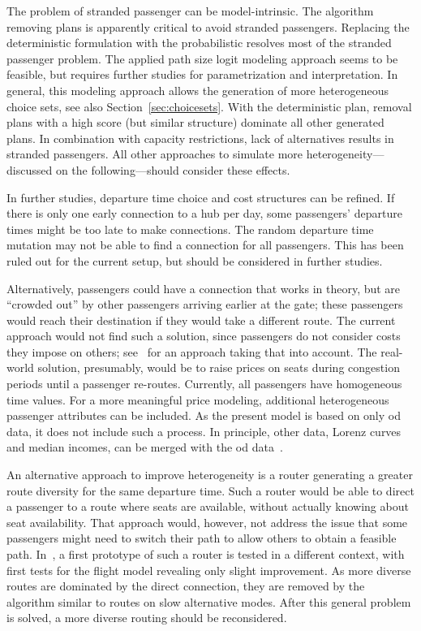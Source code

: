 The problem of stranded passenger can be model-intrinsic. 
The algorithm removing plans is apparently critical to avoid stranded passengers. 
Replacing the deterministic formulation with the probabilistic resolves most of the stranded passenger problem. 
The applied path size logit modeling approach seems to be feasible, but requires further studies for parametrization and interpretation. 
In general, this modeling approach allows the generation of more heterogeneous choice sets, see also Section~\ref{sec:choicesets}. 
With the deterministic plan, removal plans with a high score (but similar structure) dominate all other generated plans. 
In combination with capacity restrictions, lack of alternatives results in stranded passengers.  
All other approaches to simulate more heterogeneity---discussed on the following---should consider these effects.  

In further studies, departure time choice and cost structures can be refined. 
If there is only one early connection to a hub per day, some passengers' departure times might be too late to make connections. 
The random departure time mutation may not be able to find a connection for all passengers. 
This has been ruled out for the current setup, but should be considered in further studies. 

Alternatively, passengers could have a connection that works in theory, but are ``crowded out'' by other passengers arriving earlier at the gate;  
these passengers would reach their destination if they would take a different route.  
The current approach would not find such a solution, since passengers do not consider costs they impose on others; see~\citet{00LaemmelFloetteroed2009KISysOptEvac} for an approach taking that into account.  
The real-world solution, presumably, would be to raise prices on seats during congestion periods until a passenger re-routes. 
Currently, all passengers have homogeneous time values.   
For a more meaningful price modeling, additional heterogeneous passenger attributes can be included. 
As the present model is based on only \gls{od} data, it does not include such a process. 
In principle, other data, \eg Lorenz curves and median incomes, can be merged with the \gls{od} data~\citep{KickhoeferEtAl2011PolicyEvaluationIncome}.  

An alternative approach to improve heterogeneity is a router generating a greater route diversity for the same departure time.  
Such a router would be able to direct a passenger to a route where seats are available, without actually knowing about seat availability.  
That approach would, however, not address the issue that some passengers might need to switch their path to allow others to obtain a feasible path. 
In~\citet{Graf2013Da}, a first prototype of such a router is tested in a different context, with 
first tests for the flight model revealing only slight improvement. 
As more diverse routes are dominated by the direct connection, they are removed by the algorithm similar to routes on slow alternative modes. 
After this general problem is solved, a more diverse routing should be reconsidered. 

